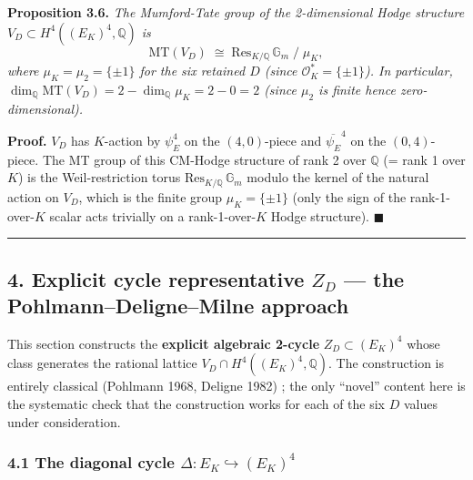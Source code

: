 \documentclass[
  11pt,
  a4paper,
]{article}
\begin{document}
\textbf{Proposition 3.6.} \emph{The Mumford-Tate group of the 2-dimensional Hodge structure \(V_D \subset H^4((E_K)^4, \mathbb{Q})\) is}
\[
\mathrm{MT}(V_D) \;\cong\; \mathrm{Res}_{K/\mathbb{Q}}\,\mathbb{G}_m \;/\; \mu_K,
\]
\emph{where \(\mu_K = \mu_2 = \{\pm 1\}\) for the six retained \(D\) (since \(\mathcal{O}_K^* = \{\pm 1\}\)). In particular, \(\dim_\mathbb{Q} \mathrm{MT}(V_D) = 2 - \dim_\mathbb{Q} \mu_K = 2 - 0 = 2\) (since \(\mu_2\) is finite hence zero-dimensional).}

\textbf{Proof.} \(V_D\) has \(K\)-action by \(\psi_E^4\) on the \((4, 0)\)-piece and \(\overline{\psi_E}^4\) on the \((0, 4)\)-piece. The MT group of this CM-Hodge structure of rank 2 over \(\mathbb{Q}\) (= rank 1 over \(K\)) is the Weil-restriction torus \(\mathrm{Res}_{K/\mathbb{Q}}\,\mathbb{G}_m\) modulo the kernel of the natural action on \(V_D\), which is the finite group \(\mu_K = \{\pm 1\}\) (only the sign of the rank-1-over-\(K\) scalar acts trivially on a rank-1-over-\(K\) Hodge structure). \(\blacksquare\)

\begin{center}\rule{0.5\linewidth}{0.5pt}\end{center}

\hypertarget{explicit-cycle-representative-z_d-the-pohlmanndelignemilne-approach}{%
\subsection{\texorpdfstring{4. Explicit cycle representative \(Z_D\) --- the Pohlmann--Deligne--Milne approach}{4. Explicit cycle representative Z\_D --- the Pohlmann--Deligne--Milne approach}}\label{explicit-cycle-representative-z_d-the-pohlmanndelignemilne-approach}}

This section constructs the \textbf{explicit algebraic 2-cycle} \(Z_D \subset (E_K)^4\) whose class generates the rational lattice \(V_D \cap H^4((E_K)^4, \mathbb{Q})\). The construction is entirely classical (Pohlmann 1968, Deligne 1982) ; the only ``novel'' content here is the systematic check that the construction works for each of the six \(D\) values under consideration.

\hypertarget{the-diagonal-cycle-delta-e_k-hookrightarrow-e_k4}{%
\subsubsection{\texorpdfstring{4.1 The diagonal cycle \(\Delta : E_K \hookrightarrow (E_K)^4\)}{4.1 The diagonal cycle \textbackslash Delta : E\_K \textbackslash hookrightarrow (E\_K)\^{}4}}\label{the-diagonal-cycle-delta-e_k-hookrightarrow-e_k4}}
\end{document}
